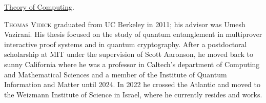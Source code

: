 \documentclass{toc}
\begin{document}
\begin{tocaboutauthors}
\begin{tocabout}[jeffery]
  \href{https://theoryofcomputing.org}{\textsf{Theory of Computing}}.
\end{tocabout}
\begin{tocabout}[vidick]
\textsc{Thomas Vidick} graduated from UC Berkeley in 2011; his advisor was Umesh Vazirani. His thesis focused on the study of quantum entanglement in multiprover interactive proof systems and in quantum cryptography. After a postdoctoral scholarship at MIT under the supervision of Scott Aaronson, he moved back to sunny California where he was a professor in Caltech's department of Computing and Mathematical Sciences and a member of the Institute of Quantum Information and Matter until 2024. In 2022 he crossed the Atlantic and moved to the Weizmann Institute of Science in Israel, where he currently resides and works. 
%
\end{tocabout}
\end{tocaboutauthors}
\end{document}

